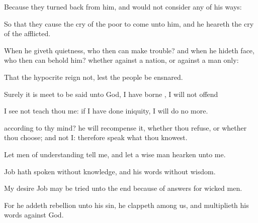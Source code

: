 {Because they turned
back from
him, and would not
consider any of his
ways:

So that they cause the
cry of the
poor to
come unto him, and he
heareth the
cry of the
afflicted.

When he giveth
quietness, who then can make
trouble? and when he
hideth
{}
face, who then can
behold him? whether
{} against a
nation, or against a
man
only:

That the
hypocrite
reign not, lest the
people be
ensnared.


\par }{\PP {}Surely it is meet to be
said unto
God, I have
borne
{}, I will not
offend
{}

 I
see
not
teach thou me: if I have
done
iniquity, I will
do no more.

 according to thy mind? he will
recompense it, whether thou
refuse, or whether thou
choose; and not I: therefore
speak what thou
knowest.

Let
men of
understanding
tell me, and let a
wise
man
hearken unto me.

Job hath
spoken without
knowledge, and his
words
{} without
wisdom.

My
desire
{}
Job may be
tried unto the
end because of
{}
answers for
wicked
men.

For he
addeth
rebellion unto his
sin, he
clappeth
{} among us, and
multiplieth his
words against
God.




\par }
